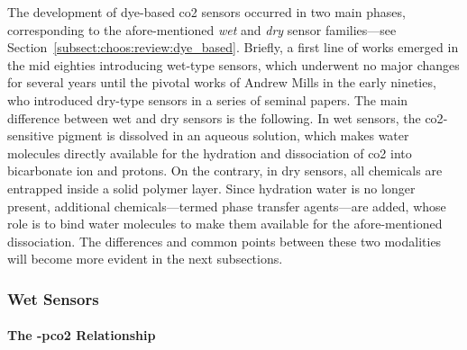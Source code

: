 The development of dye-based \gls{co2} sensors occurred in two main phases, corresponding to the afore-mentioned \emph{wet} and \emph{dry} sensor families---see Section~\ref{subsect:choos:review:dye_based}. Briefly, a first line of works emerged in the mid eighties introducing wet-type sensors\cite{vurek1983, zhujun1984a, zhujun1984b, opitz1984}, which underwent no major changes for several years until the pivotal works of Andrew Mills in the early nineties, who introduced dry-type sensors in a series of seminal papers\cite{mills1992, mills1993, mills1997}. The main difference between wet and dry sensors is the following. In wet sensors, the \gls{co2}-sensitive pigment is dissolved in an aqueous solution, which makes water molecules directly available for the hydration and dissociation of \gls{co2} into bicarbonate ion and protons. On the contrary, in dry sensors, all chemicals are entrapped inside a solid polymer layer. Since hydration water is no longer present, additional chemicals---termed phase transfer agents---are added, whose role is to bind water molecules to make them available for the afore-mentioned dissociation. The differences and common points between these two modalities will become more evident in the next subsections.

\subsubsection{Wet Sensors}

\paragraph{The \texorpdfstring{\pH-\gls{pco2}}{pH-pCO2} Relationship}\mbox{}\\


